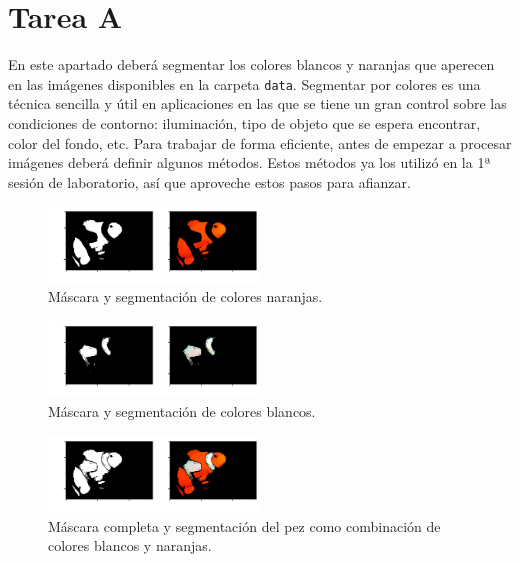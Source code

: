 \chapter{Tarea A}
\label{chapter:tarea_a}

En este apartado deberá segmentar los colores blancos y naranjas que aperecen en las imágenes disponibles en la carpeta \texttt{data}. Segmentar por colores es una técnica sencilla y útil en aplicaciones en las que se tiene un gran control sobre las condiciones de contorno: iluminación, tipo de objeto que se espera encontrar, color del fondo, etc. Para trabajar de forma eficiente, antes de empezar a procesar imágenes deberá definir algunos métodos. Estos métodos ya los utilizó en la 1ª sesión de laboratorio, así que aproveche estos pasos para afianzar.

\begin{figure}[h]
    \centering
    \includegraphics[width=0.5\textwidth]{Lab_2/template/figures/orange.png}
    \caption{Máscara y segmentación de colores naranjas.}
    \label{fig:orange_mask}
\end{figure}

\begin{figure}[h]
    \centering
    \includegraphics[width=0.5\textwidth]{Lab_2/template/figures/white.png}
    \caption{Máscara y segmentación de colores blancos.}
    \label{fig:whithe_mask}
\end{figure}

\begin{figure}[h]
    \centering
    \includegraphics[width=0.5\textwidth]{Lab_2/template/figures/output.png}
    \caption{Máscara completa y segmentación del pez como combinación de colores blancos y naranjas.}
    \label{fig:fish_output}
\end{figure}